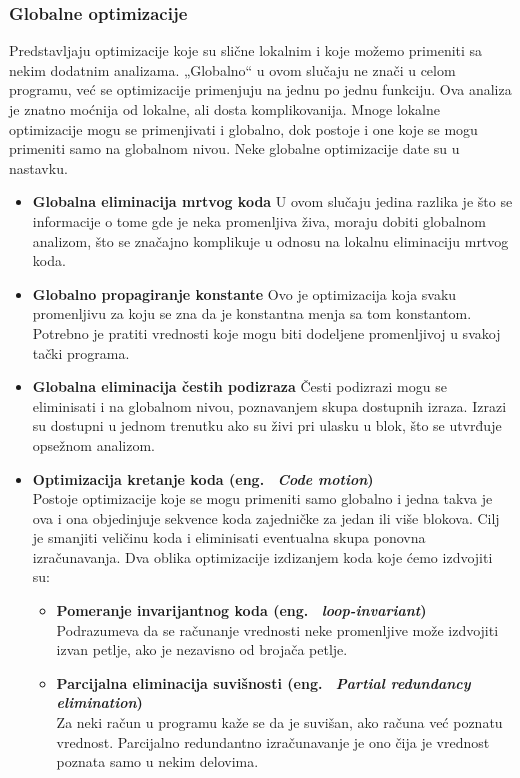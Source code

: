 \documentclass[a4paper]{article}
\begin{document}
\subsubsection{Globalne optimizacije}
\label{subsubsec:globalne}
Predstavljaju optimizacije koje su slične lokalnim i koje možemo primeniti sa nekim dodatnim analizama.
„Globalno“ u ovom slučaju ne znači u celom programu, već se optimizacije primenjuju na jednu po jednu fu\-nkciju. 
Ova analiza je znatno moćnija od lokalne, ali dosta komplikovanija. 
Mnoge lokalne optimizacije mogu se primenjivati i globalno, dok postoje i one koje se mogu primeniti samo na globalnom nivou.
Neke globalne optimizacije date su u nastavku.

\begin{itemize}
  \item \textbf{Globalna eliminacija mrtvog koda} \newline
  U ovom slučaju jedina razlika je što se informacije o tome gde je neka promenljiva živa, moraju dobiti globalnom analizom, što se značajno komplikuje u odnosu na lokalnu eliminaciju mrtvog koda.
  \item \textbf{Globalno propagiranje konstante} \newline
  Ovo je optimizacija koja svaku promenljivu za koju se zna da je konstantna menja sa tom konstantom.
  Potrebno je pratiti vrednosti koje mogu biti dodeljene promenljivoj u svakoj tački programa. 
  \item \textbf{Globalna eliminacija čestih podizraza} \newline
  Česti podizrazi mogu se eliminisati  i na globalnom nivou, poznavanjem skupa dostupnih izraza.
  Izrazi su dostupni u jednom trenutku ako su živi pri ulasku u blok, što se utvrđuje opsežnom analizom.
  \item \textbf{Optimizacija kretanje koda (eng. ~{\em Code motion})} \\
  Postoje optimizacije koje se mogu primeniti samo globalno i jedna takva je ova i ona objedinjuje sekvence koda zajedničke za jedan ili više blokova. 
  Cilj je smanjiti veličinu koda i eliminisati eventualna skupa ponovna izračunavanja. 
  Dva oblika optimizacije izdizanjem koda koje ćemo izdvojiti su:
  \begin{itemize}
    \item \textbf{Pomeranje invarijantnog koda (eng. ~{\em loop-invariant})} \\
       Podrazumeva da se računanje vrednosti neke promenljive može izdvojiti izvan petlje, ako je nezavisno od brojača petlje.
    \item \textbf{Parcijalna eliminacija suvišnosti (eng. ~{\em Partial redundancy elimination})} \\
    Za neki račun u programu kaže se da je suvišan, ako računa već poznatu vrednost. 
    Parcijalno redundantno izračunavanje  je ono čija je vrednost poznata samo u nekim delovima. \cite{stanford}
    
  \end{itemize}
\end{itemize}
\end{document}
